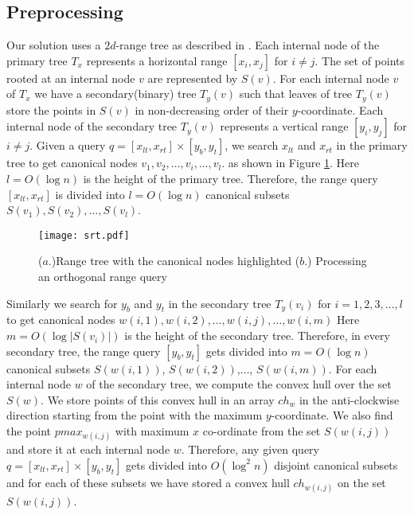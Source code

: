 \documentclass[runningheads,a4paper]{llncs}
\begin{document}
\subsection{Preprocessing}\label{preprocessing}
Our solution uses a $2d$-range tree as described in \cite{berg}.  Each
internal node of the primary tree $T_{x}$ represents a horizontal range
$[x_{i}, x_{j}]$ for $i \neq j$.  The set of points rooted at an internal node
$v$ are represented by $S(v)$. For each internal node $v$ of $T_{x}$ we have a
secondary(binary) tree $T_{y}(v)$ such that leaves of tree $T_{y}(v)$ store
the points in $S(v)$ in non-decreasing order of their $y$-coordinate.  Each
internal node of the secondary tree $T_{y}(v)$ represents a vertical range
$[y_{i}, y_{j}]$ for $i \neq j$.  Given a query $q = [x_{lt}, x_{rt}] \times
[y_{b}, y_{t}]$, we search $x_{lt}$ and $x_{rt}$ in the primary tree to get canonical nodes
$ v_{1}, v_{2}, \ldots, v_{i},\ldots, v_{l} $.
as shown in Figure \ref{fig3}. Here $l=O(\log n)$ is the height of the primary
tree. Therefore, the range query $[x_{lt},x_{rt}]$ is divided into $l=O(\log
n)$ canonical subsets $ S(v_{1}), S(v_{2}),\ldots, S(v_{l})$.
\begin{figure}
\vspace{-0.7cm}
\centering
\texttt{[image: srt.pdf]}
\caption{($a$.)Range tree with the canonical nodes highlighted ($b$.) Processing an orthogonal range query}
\label{fig3}
\vspace{-0.7cm}
\end{figure}
Similarly we search for $y_{b}$ and $y_{t}$ in the secondary tree
$T_{y}(v_{i})$ for $i=1,2,3,\ldots,l$ to get canonical nodes
$w(i,1),w(i,2),\ldots, w(i,j),\ldots, w(i,m)$
Here $m=O(\log |S(v_{i})|)$ is the height of the secondary
tree. Therefore, in every secondary tree, the range query $[y_{b},y_{t}]$ gets
divided into $m=O(\log n)$ canonical subsets $S(w(i,1))$, $S(w(i,2))$,$\ldots$, $S(w(i,m))$.
For each internal node $w$ of the secondary tree, we compute the convex hull over the set $S(w)$.
We store points of this convex hull in an array $ch_{w}$
in the anti-clockwise direction starting from the point with the maximum $y$-coordinate. 
We also find the point $pmax_{w(i,j)}$ with maximum $x$ co-ordinate from the set $S(w(i,j))$ and store it at each internal node $w$.
Therefore, any given query $q = [x_{lt}, x_{rt}] \times [y_{b}, y_{t}]$ gets divided into $O(\log^{2} n)$ disjoint canonical subsets and 
for each of these subsets we have stored a convex hull $ch_{w(i,j)}$ on the set $S(w(i,j))$.
\end{document}
